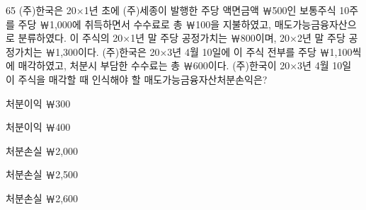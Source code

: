 \begin{question}{65}
(주)한국은 20×1년 초에 (주)세종이 발행한 주당 액면금액 ￦500인 보통주식 10주를 주당 ￦1,000에 취득하면서 수수료로 총 ￦100을 지불하였고, 매도가능금융자산으로 분류하였다. 이 주식의 20×1년 말 주당 공정가치는 ￦800이며, 20×2년 말 주당 공정가치는 ￦1,300이다. (주)한국은 20×3년 4월 10일에 이 주식 전부를 주당 ￦1,100씩에 매각하였고, 처분시 부담한 수수료는 총 ￦600이다. (주)한국이 20×3년 4월 10일 이 주식을 매각할 때 인식해야 할 매도가능금융자산처분손익은?
\begin{choices}
  \item 처분이익 ￦300
  \item 처분이익 ￦400
  \item 처분손실 ￦2,000
  \item 처분손실 ￦2,500
  \item 처분손실 ￦2,600
\end{choices}
\end{question}
